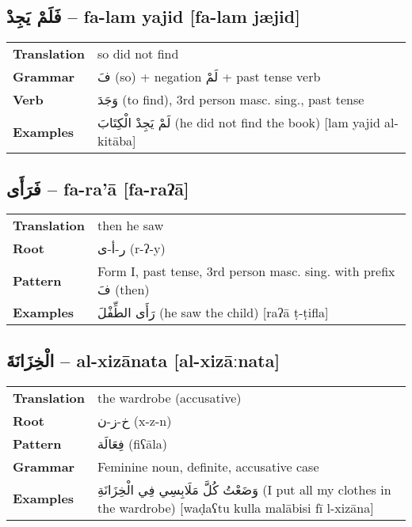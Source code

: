 \documentclass[a4paper,12pt]{article}
\begin{document}
\subsection{\textarabic{فَلَمْ يَجِدْ} – \textbf{fa-lam yajid} [fa-lam jæjid]}
\begin{tabular}{p{3cm}p{10cm}}
\toprule
\textbf{Translation} & so did not find \\
\textbf{Grammar} & \textarabic{فَ} (so) + negation \textarabic{لَمْ} + past tense verb \\
\textbf{Verb} & \textarabic{وَجَدَ} (to find), 3rd person masc. sing., past tense \\
\textbf{Examples} & \textarabic{لَمْ يَجِدْ الْكِتَابَ} (he did not find the book) [lam yajid al-kitāba] \\
\bottomrule
\end{tabular}

\subsection{\textarabic{فَرَأَى} – \textbf{fa-ra'ā} [fa-raʔā]}
\begin{tabular}{p{3cm}p{10cm}}
\toprule
\textbf{Translation} & then he saw \\
\textbf{Root} & \textarabic{ر-أ-ى} (r-ʔ-y) \\
\textbf{Pattern} & Form I, past tense, 3rd person masc. sing. with prefix \textarabic{فَ} (then) \\
\textbf{Examples} & \textarabic{رَأَى الطِّفْلَ} (he saw the child) [raʔā ṭ-ṭifla] \\
\bottomrule
\end{tabular}

\subsection{\textarabic{الْخِزَانَةَ} – \textbf{al-xizānata} [al-xizāːnata]}
\begin{tabular}{p{3cm}p{10cm}}
\toprule
\textbf{Translation} & the wardrobe (accusative) \\
\textbf{Root} & \textarabic{خ-ز-ن} (x-z-n) \\
\textbf{Pattern} & \textarabic{فِعَالَة} (fiʕāla) \\
\textbf{Grammar} & Feminine noun, definite, accusative case \\
\textbf{Examples} & \textarabic{وَضَعْتُ كُلَّ مَلَابِسِي فِي الْخِزَانَةِ} (I put all my clothes in the wardrobe) [waḍaʕtu kulla malābisi fī l-xizāna] \\
\bottomrule
\end{tabular}
\end{document}
